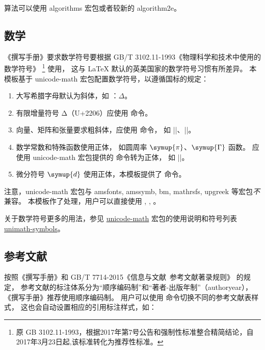 \documentclass[a4paper]{ltxdoc}
\DeclareRobustCommand\pkg{\textsf}
\begin{document}
算法可以使用 \pkg{algorithms} 宏包或者较新的 \pkg{algorithm2e}。


\subsection{数学}

\DescribeMacro{\symup}
\DescribeMacro{\symbf}
《撰写手册》要求数学符号要根据 GB/T 3102.11-1993《物理科学和技术中使用的数学符号》
\footnote{原 GB 3102.11-1993，根据2017年第7号公告和强制性标准整合精简结论，自2017年3月23日起,该标准转化为推荐性标准。}
使用，
这与 \LaTeX{} 默认的英美国家的数学符号习惯有所差异。
本模板基于 \pkg{unicode-math} 宏包配置数学符号，以遵循国标的规定：
\begin{enumerate}
  \item 大写希腊字母默认为斜体，如 ：$\Delta$。
  \item 有限增量符号 $\increment$（U+2206）应使用  命令。
  \item 向量、矩阵和张量要求粗斜体，应使用  命令，
    如 ||、|\symbf{\alpha}|。
  \item 数学常数和特殊函数使用正体，
    如圆周率 $\symup{\pi}$、$\symup{\Gamma}$ 函数。
    应使用 \pkg{unicode-math} 宏包提供的  命令转为正体，
    如 |\symup{\pi}|。
  \item 微分符号 $\symup{d}$ 使用正体，本模板提供了  命令。
\end{enumerate}

注意，\pkg{unicode-math} 宏包与 \pkg{amsfonts}, \pkg{amssymb}, \pkg{bm},
\pkg{mathrsfs}, \pkg{upgreek} 等宏包\emph{不}兼容。
本模板作了处理，用户可以直接使用 , ,
。

关于数学符号更多的用法，参见
\href{http://mirrors.ctan.org/macros/latex/contrib/unicode-math/unicode-math.pdf}{\pkg{unicode-math}}
宏包的使用说明和符号列表
\href{http://mirrors.ctan.org/macros/latex/contrib/unicode-math/unimath-symbols.pdf}{\pkg{unimath-symbols}}。


\subsection{参考文献}

\DescribeMacro{}
按照《撰写手册》和 GB/T 7714-2015《信息与文献\ 参考文献著录规则》 的规定，
参考文献的标注体系分为“顺序编码制”和“著者-出版年制”（authoryear），
《撰写手册》推荐使用顺序编码制。
用户可以使用  命令切换不同的参考文献表样式，
这也会自动设置相应的引用标注样式，如：
\begin{latex}
  
\end{latex}
\end{document}
